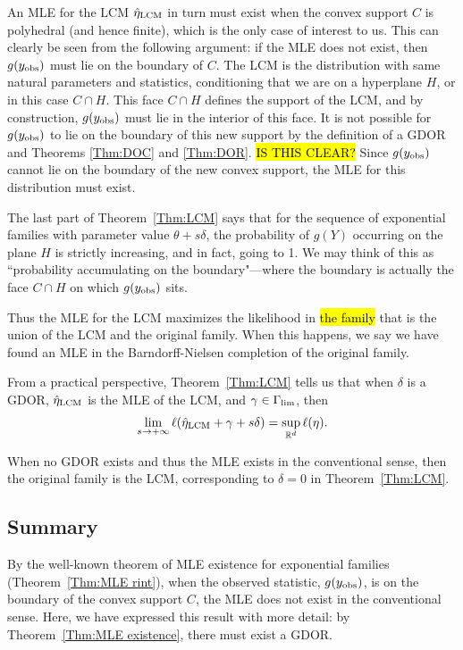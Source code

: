 An MLE for the LCM $\hat{\eta}_{\textrm{LCM}}$ in turn must exist when the convex support $C$ is polyhedral 
(and hence finite), which is the only case of interest to us.  
This can clearly be seen from the following argument: if the MLE does not exist,
then $g(y_{\textrm{obs}})$ must lie on the boundary of $C$.  The LCM is the distribution
with same natural parameters and statistics, conditioning that we are on a hyperplane
$H$, or in this case $C \cap H$.  This face $C \cap H$ defines the support of the LCM,
and by construction, $g(y_{\textrm{obs}})$ must lie in the interior of this face.  It is not
possible for $g(y_{\textrm{obs}})$ to lie on the boundary of this new support by the definition 
of a GDOR and Theorems \ref{Thm:DOC} and \ref{Thm:DOR}.  \hl{IS THIS CLEAR?}
Since $g(y_{\textrm{obs}})$ cannot lie on the boundary of the new convex support, the MLE for
this distribution must exist.

The last part of Theorem~\ref{Thm:LCM} says that for the sequence of exponential families with parameter 
value $\theta+s\delta$, the probability of $g(Y)$ occurring on the plane $H$ is strictly 
increasing, and in fact, going to 1.  We may think of this as 
``probability accumulating on the boundary"---where the 
boundary is actually the face $C \cap H$ on which $g(y_{\textrm{obs}})$ sits.

Thus the MLE for the LCM maximizes the likelihood in \hl{the family} that is the 
union of the LCM and the original family.  When 
this happens, we say we have found an MLE in the Barndorff-Nielsen completion of the 
original family.


From a practical perspective, Theorem~\ref{Thm:LCM} tells us that when 
$\delta$ is a GDOR, $\hat{\eta}_{\textrm{LCM}}$ is the MLE of the LCM, and $\gamma \in \Gamma_{\textrm{lim}}$, then
\begin{align*}
	\lim_{s \to +\infty} \ell(\hat{\eta}_{\textrm{LCM}} + \gamma + s\delta) = \sup_{{\mathbb R}^d} \ell(\eta).
\end{align*}

When no GDOR exists and thus the MLE exists in the conventional sense, then the 
original family is the LCM, corresponding to $\delta=0$ in Theorem~\ref{Thm:LCM}.

\subsection{Summary}
By the well-known theorem of MLE existence for exponential families (Theorem~\ref{Thm:MLE rint}), when the observed statistic, $g(y_{\textrm{obs}})$, is 
on the boundary of the convex support $C$, the MLE does not exist in the conventional 
sense.
Here, we have expressed this result with more detail: by Theorem~\ref{Thm:MLE existence}, there must exist a GDOR.

